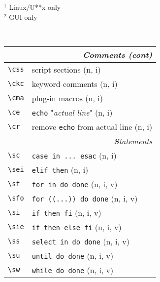 \documentclass[oneside,11pt,landscape,DIV16]{scrartcl}
\begin{document}
\begin{multicols}{3}
\begin{center}
\begin{minipage}[b]{75mm}
{%
$^1$ {Linux/U**x only}\\
$^2$ {GUI only}
}%
\end{minipage}\\
%
\begin{tabular}[]{|p{11mm}|p{60mm}|}
\hline
	\multicolumn{2}{|r|}{\textsl{\textbf{C}omments (cont)}}                       \\[1.0ex]
\hline     \verb'\css'  & script sections                   \hfill (n, i)\\
\hline     \verb'\ckc'  & keyword comments                  \hfill (n, i)\\
\hline     \verb'\cma'  & plug-in macros                    \hfill (n, i)\\
%
\hline     \verb'\ce'   & \texttt{echo} "\textsl{actual line}"  \hfill (n, i)\\
\hline     \verb'\cr'   & remove \texttt{echo} from actual line \hfill (n, i)\\
\hline
\hline
\multicolumn{2}{|r|}{\textsl{\textbf{S}tatements}}                    \\[1.0ex]
\hline \verb'\sc'  & \verb'case in ... esac'               \hfill (n, i)\\
\hline \verb'\sei' & \verb'elif then'                      \hfill (n, i)\\
\hline \verb'\sf'  & \verb'for in do done'                 \hfill (n, i, v)\\
\hline \verb'\sfo' & \verb'for ((...)) do done'            \hfill (n, i, v)\\
\hline \verb'\si'  & \verb'if then fi'                     \hfill (n, i, v)\\
\hline \verb'\sie' & \verb'if then else fi'                \hfill (n, i, v)\\
\hline \verb'\ss'  & \verb'select in do done'              \hfill (n, i, v)\\
\hline \verb'\su'  & \verb'until do done'                  \hfill (n, i, v)\\
\hline \verb'\sw'  & \verb'while do done'                  \hfill (n, i, v)\\

\end{tabular}
\end{center}
\end{multicols}
\end{document}
